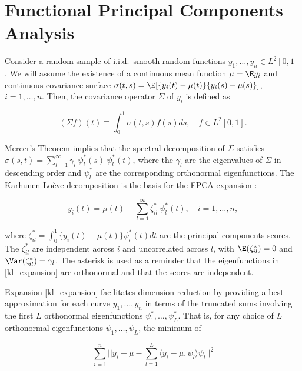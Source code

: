 \documentclass[12pt]{article}
\theoremstyle{plain}
\theoremstyle{definition}
\theoremstyle{remark}
\begin{document}

\section{Functional Principal Components Analysis}
\label{sec:fpca}

Consider a random sample of i.i.d.\ smooth random functions $y_1, \dots, y_n \in L^2 [0, 1]$. We will assume the
existence of a continuous mean function $\mu = \E y_i$ and continuous covariance surface
$\sigma (t, s) = \E [ \{ y_i (t) - \mu (t) \} \{ y_i (s) - \mu (s) \} ]$, $i = 1, \dots, n$.
Then, the covariance operator $\Sigma$ of $y_i$ is defined as

\begin{equation}
	(\Sigma f) (t) \equiv \int_0^1 \sigma (t, s) f(s) ds, \quad f \in L^2 [0, 1].
\label{cov_op}
\end{equation}

\noindent Mercer's Theorem implies that the spectral decomposition of $\Sigma$ satisfies $\sigma (s, t) =
\sum_{l=1}^\infty \gamma_l \ \psi^*_l (s) \ \psi^*_l (t)$, where the $\gamma_l$ are the eigenvalues of
$\Sigma$ in descending
order and $\psi^*_l$ are the corresponding orthonormal eigenfunctions. The Karhunen-Lo\`{e}ve decomposition
is the basis for the FPCA expansion \cite{yao05}:

\begin{equation}
	y_i (t) = \mu (t) + \sum_{l=1}^\infty \zeta^*_{il} \ \psi^*_l (t), \quad i = 1, \dots, n,
\label{kl_expansion}
\end{equation}

\noindent where $\zeta^*_{il} = \int_0^1 \{ y_i (t) - \mu(t) \} \psi^*_l(t) dt$ are the principal components
scores. The $\zeta^*_{il}$ are independent across $i$ and uncorrelated across $l$, with $\E (\zeta^*_{il}) = 0$
and $\Var (\zeta^*_{il}) = \gamma_l$.
The asterisk is used as a reminder that the eigenfunctions in
\eqref{kl_expansion} are orthonormal and that the scores are independent.

Expansion \eqref{kl_expansion} facilitates dimension reduction by providing a best approximation for each
curve $y_1, \dots, y_n$ in terms of the truncated sums involving the first $L$ orthonormal eigenfunctions
$\psi^*_1, \dots, \psi^*_L$. That is, for any choice of $L$ orthonormal eigenfunctions $\psi_1, \dots, \psi_L$, the
minimum of

\[
	\sum_{i=1}^n || y_i - \mu - \sum_{l=1}^L \langle y_i - \mu , \psi_l \rangle \psi_l ||^2
\]
\end{document}
